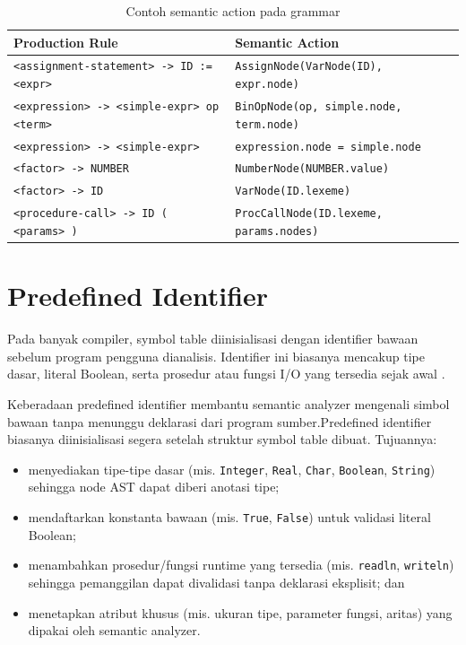 \begin{table}[H]
    \centering
    \caption{Contoh semantic action pada grammar}
    \label{tab:semantic-action}
    \begin{tabularx}{\textwidth}{L L}
        \toprule
        \textbf{Production Rule}                         & \textbf{Semantic Action}                       \\
        \midrule
        \texttt{<assignment-statement> -> ID := <expr>}  & \texttt{AssignNode(VarNode(ID), expr.node)}    \\
        \texttt{<expression> -> <simple-expr> op <term>} & \texttt{BinOpNode(op, simple.node, term.node)} \\
        \texttt{<expression> -> <simple-expr>}           & \texttt{expression.node = simple.node}         \\
        \texttt{<factor> -> NUMBER}                      & \texttt{NumberNode(NUMBER.value)}              \\
        \texttt{<factor> -> ID}                          & \texttt{VarNode(ID.lexeme)}                    \\
        \texttt{<procedure-call> -> ID ( <params> )}     & \texttt{ProcCallNode(ID.lexeme, params.nodes)} \\
        \bottomrule
    \end{tabularx}
\end{table}

\section{Predefined Identifier}
Pada banyak compiler, symbol table diinisialisasi dengan identifier bawaan sebelum program pengguna dianalisis. Identifier ini biasanya mencakup tipe dasar, literal Boolean, serta prosedur atau fungsi I/O yang tersedia sejak awal \cite{wirth1996compiler,aho2007compilers}.

Keberadaan predefined identifier membantu semantic analyzer mengenali simbol bawaan tanpa menunggu deklarasi dari program sumber.Predefined identifier biasanya diinisialisasi segera setelah struktur symbol table dibuat. Tujuannya:

\begin{itemize}
    \item menyediakan tipe-tipe dasar (mis. \texttt{Integer}, \texttt{Real}, \texttt{Char}, \texttt{Boolean}, \texttt{String}) sehingga node AST dapat diberi anotasi tipe;
    \item mendaftarkan konstanta bawaan (mis. \texttt{True}, \texttt{False}) untuk validasi literal Boolean;
    \item menambahkan prosedur/fungsi runtime yang tersedia (mis. \texttt{readln}, \texttt{writeln}) sehingga pemanggilan dapat divalidasi tanpa deklarasi eksplisit; dan
    \item menetapkan atribut khusus (mis. ukuran tipe, parameter fungsi, aritas) yang dipakai oleh semantic analyzer.
\end{itemize}

